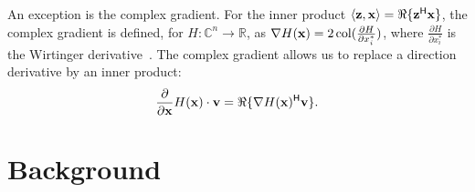 An exception is the complex gradient. For the inner product $\langle \mathbf{z}, \mathbf{x} \rangle = \Re\{\mathbf{z}^{\mathsf{H}} \mathbf{x}\}$, the complex gradient is defined, for $H: \mathbb{C}^n \to \mathbb{R}$, as $\nabla H(\mathbf{x}) = 2 \operatorname*{col}(\frac{\partial H}{\partial x_i^*})$, where $\frac{\partial H}{\partial x_i^*}$ is the Wirtinger derivative~\cite{remmert1991theory}. The complex gradient allows us to replace a direction derivative by an inner product: 
\begin{equation*}
    \frac{\partial}{\partial \mathbf{x}} H(\mathbf{x})\cdot \mathbf{v} = \Re\{\nabla H(\mathbf{x})^{\mathsf{H}} \mathbf{v}\}.
\end{equation*}





\section{Background} \label{sec_background}


